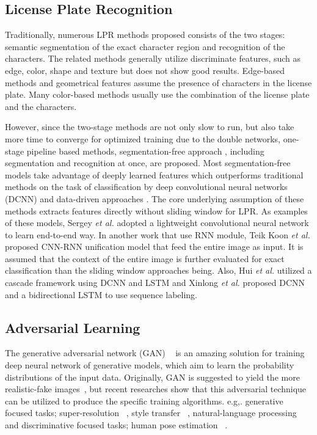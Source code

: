 \documentclass[a4paper,twoside]{article}
\begin{document}
\subsection{License Plate Recognition}
Traditionally, numerous LPR methods proposed consists of the two stages: semantic segmentation of the exact character region and recognition of the characters. The related methods generally utilize discriminate features, such as edge, color, shape and texture but does not show good results. Edge-based methods \cite{kim2000learning,zhang2006learning,wang2003detection,kim2000learning,zhang2006learning} and geometrical features \cite{wang2003detection} assume the presence of characters in the license plate. Many color-based methods \cite{shi2005automatic,chen2009automatic} usually use the combination of the license plate and the characters. 

However, since the two-stage methods are not only slow to run, but also take more time to converge for optimized training due to the double networks, one-stage pipeline based methods, segmentation-free approach \cite{zherzdev2018lprnet,cheang2017segmentation,li2016reading,wangadversarial}, including segmentation and recognition at once, are proposed. Most segmentation-free models take advantage of deeply learned features which outperforms traditional methods on the task of classification by deep convolutional neural networks (DCNN) \cite{simonyan2014very,he2016deep} and data-driven approaches \cite{russakovsky2015imagenet}. The core underlying assumption of these methods extracts features directly without sliding window for LPR. As examples of these models, Sergey \textit{et al.} \cite{zherzdev2018lprnet} adopted a lightweight convolutional neural network to learn end-to-end way. In another work that use RNN module, Teik Koon \textit{et al.} \cite{cheang2017segmentation} proposed CNN-RNN unification model that feed the entire image as input. It is assumed that the context of the entire image is further evaluated for exact classification than the sliding window approaches being. Also, Hui \textit{et al.} \cite{li2016reading} utilized a cascade framework using DCNN and LSTM and Xinlong \textit{et al.} \cite{wangadversarial} proposed DCNN and a bidirectional LSTM to use sequence labeling.

\subsection{Adversarial Learning}
The generative adversarial network (GAN) ~\cite{goodfellow2014generative,radford2015unsupervised,radford2015unsupervised} is an amazing solution for training deep neural network of generative models, which aim to learn the probability distributions of the input data. Originally, GAN is suggested to yield the more realistic-fake images~\cite{frid2018gan}, but recent researches show that this adversarial technique can be utilized to produce the specific training algorithms. e.g,. generative focused tasks; super-resolution ~\cite{nguyen2016plug,ledig2017photo,lee2018accurate}, style transfer ~\cite{zhu2017unpaired,li2017demystifying}, natural-language processing ~\cite{rajeswar2017adversarial} and discriminative focused tasks; human pose estimation ~\cite{chou2017self,peng2018jointly}.
\end{document}
